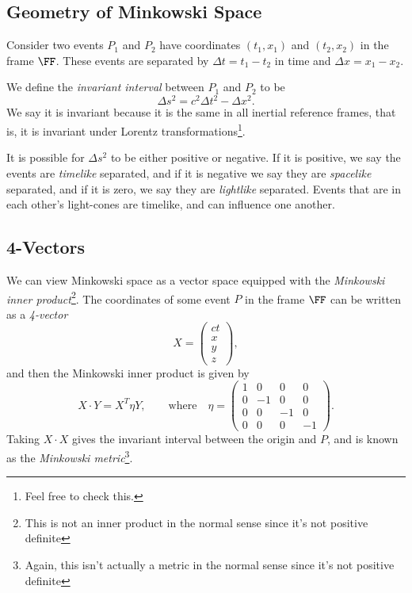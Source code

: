 \documentclass[a4paper]{scrartcl}
\begin{document}
\subsection{Geometry of Minkowski Space}

Consider two events $P_1$ and $P_2$ have coordinates $(t_1, x_1)$ and $(t_2, x_2)$ in the frame $\FF$. These events are separated by $\Delta t = t_1 - t_2$ in time and $\Delta x = x_1 - x_2$.

We define the \emph{invariant interval} between $P_1$ and $P_2$ to be
$$
\Delta s^2 = c^2 \Delta t^2 - \Delta x^2.
$$
We say it is invariant because it is the same in all inertial reference frames, that is, it is invariant under Lorentz transformations\footnote{Feel free to check this.}.

It is possible for $\Delta s^2$ to be either positive or negative. If it is positive, we say the events are \emph{timelike} separated, and if it is negative we say they are \emph{spacelike} separated, and if it is zero, we say they are \emph{lightlike} separated. Events that are in each other's light-cones are timelike, and can influence one another.

\subsection{4-Vectors}

We can view Minkowski space as a vector space equipped with the \emph{Minkowski inner product}\footnote{This is not an inner product in the normal sense since it's not positive definite}. The coordinates of some event $P$ in the frame $\FF$ can be written as a \emph{4-vector}
$$	
X= \begin{pmatrix}
	ct \\ x \\ y \\ z
\end{pmatrix},
$$
and then the Minkowski inner product is given by
$$
X \cdot Y = X^T \eta Y, \quad \quad \text{where} \quad \eta = \begin{pmatrix}
	1 & 0 & 0 & 0 \\
	0 & -1 & 0 & 0 \\
	0 & 0 & -1 & 0 \\
	0 & 0 & 0 & -1
\end{pmatrix}.
$$
Taking $X \cdot X$ gives the invariant interval between the origin and $P$, and is known as the \emph{Minkowski metric}\footnote{Again, this isn't actually a metric in the normal sense since it's not positive definite}.
\end{document}
